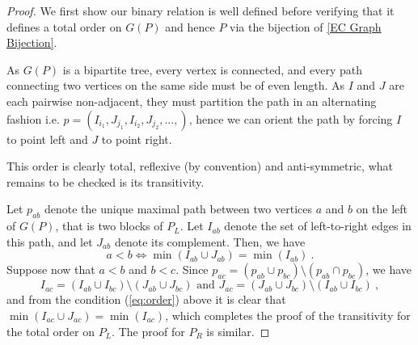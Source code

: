\begin{proof}
We first show our binary relation is well defined before verifying that it defines a total order on $G(P)$ and hence $P$ via the bijection of \cref{EC Graph Bijection}.

As $G(P)$ is a bipartite tree, every vertex is connected, and every path connecting two vertices on the same side must be of even length. 
As $I$ and $J$ are each pairwise non-adjacent, they must partition the path in an alternating fashion i.e. $p=(I_{i_1},J_{j_1},I_{i_2},J_{j_2},..., )$, hence we can orient the path by forcing $I$ to point left and $J$ to point right.

This order is clearly total, reflexive (by convention) and anti-symmetric, what remains to be checked is its transitivity. 

Let $p_{ab}$ denote the unique maximal path between two vertices $a$ and $b$ on the left of $G(P)$, that is two blocks of $P_L$. 
Let $I_{ab}$ denote the set of left-to-right edges in this path, and let $J_{ab}$ denote its complement. 
Then, we have 
\begin{equation}
    \label{eq:order}
    a < b \iff \min(I_{ab}\cup J_{ab})=\min(I_{ab}) \ . 
\end{equation}
Suppose now that $a < b$ and $b < c$.
Since $p_{ac}= (p_{ab} \cup p_{bc}) \setminus (p_{ab} \cap p_{bc})$, we have $$ I_{ac}=(I_{ab}\cup I_{bc}) \setminus (J_{ab} \cup J_{bc}) \text{ and } J_{ac}=(J_{ab}\cup J_{bc}) \setminus (I_{ab} \cup I_{bc}) \ , $$ and from the condition (\ref{eq:order}) above it is clear that $\min(I_{ac}\cup J_{ac})=\min(I_{ac})$, which completes the proof of the transitivity for the total order on $P_L$. 
The proof for $P_R$ is similar. 
\end{proof}

